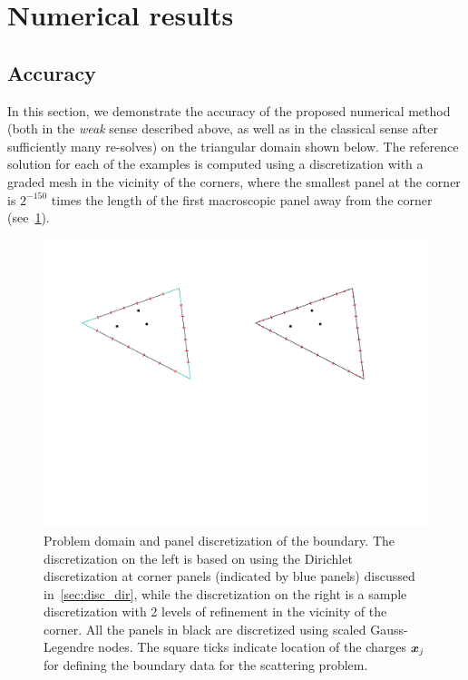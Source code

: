 
\section{Numerical results \label{sec:num}}
\subsection{Accuracy}
In this section, we demonstrate the accuracy of the proposed numerical method (both in the {\it weak} sense 
described above, 
as well as in the classical sense after sufficiently many re-solves) on the triangular domain shown below. 
The reference solution for each of the examples is computed using a discretization with
a graded mesh in the vicinity of the corners, where the smallest panel at the corner is $2^{-150}$ times
the length of the first macroscopic panel away from the corner (see~\cref{fig:dom}). 

\begin{figure}
\begin{center}
\includegraphics[width=0.7\linewidth]{media/discretization}
\caption{Problem domain and panel discretization of the boundary. The discretization on the left is based on using the Dirichlet
discretization at corner panels (indicated by blue panels) discussed in~\cref{sec:disc_dir}, while the discretization on the right is a sample discretization with 2 levels of refinement in the vicinity of the corner. All the panels in black are discretized using scaled Gauss-Legendre nodes. The square ticks indicate location of the charges $\boldsymbol{x}_{j}$ for defining the boundary data for the scattering problem.}
\end{center}
\label{fig:dom}
\end{figure}

